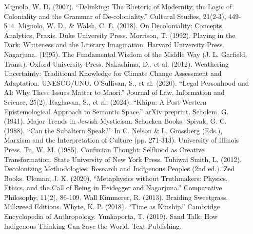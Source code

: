 \documentclass[11pt,a4paper,openany]{book}
\begin{document}
Mignolo, W. D. (2007). “Delinking: The Rhetoric of Modernity, the Logic of Coloniality and the Grammar of De-coloniality.” Cultural Studies, 21(2-3), 449-514. Mignolo, W. D., \& Walsh, C. E. (2018). On Decoloniality: Concepts, Analytics, Praxis. Duke University Press. Morrison, T. (1992). Playing in the Dark: Whiteness and the Literary Imagination. Harvard University Press. Nagarjuna. (1995). The Fundamental Wisdom of the Middle Way (J. L. Garfield, Trans.). Oxford University Press. Nakashima, D., et al. (2012). Weathering Uncertainty: Traditional Knowledge for Climate Change Assessment and Adaptation. UNESCO/UNU. O’Sullivan, S., et al. (2020). “Legal Personhood and AI: Why These Issues Matter to Maori.” Journal of Law, Information and Science, 25(2). Raghavan, S., et al. (2024). “Khipu: A Post-Western Epistemological Approach to Semantic Space.” arXiv preprint. Scholem, G. (1941). Major Trends in Jewish Mysticism. Schocken Books. Spivak, G. C. (1988). “Can the Subaltern Speak?” In C. Nelson \& L. Grossberg (Eds.), Marxism and the Interpretation of Culture (pp. 271-313). University of Illinois Press. Tu, W. M. (1985). Confucian Thought: Selfhood as Creative Transformation. State University of New York Press. Tuhiwai Smith, L. (2012). Decolonizing Methodologies: Research and Indigenous Peoples (2nd ed.). Zed Books. Uleman, J. K. (2020). “Metaphysics without Truthmakers: Physics, Ethics, and the Call of Being in Heidegger and Nagarjuna.” Comparative Philosophy, 11(2), 86-109. Wall Kimmerer, R. (2013). Braiding Sweetgrass. Milkweed Editions. Whyte, K. P. (2018). “Time as Kinship.” Cambridge Encyclopedia of Anthropology. Yunkaporta, T. (2019). Sand Talk: How Indigenous Thinking Can Save the World. Text Publishing.
\end{document}
